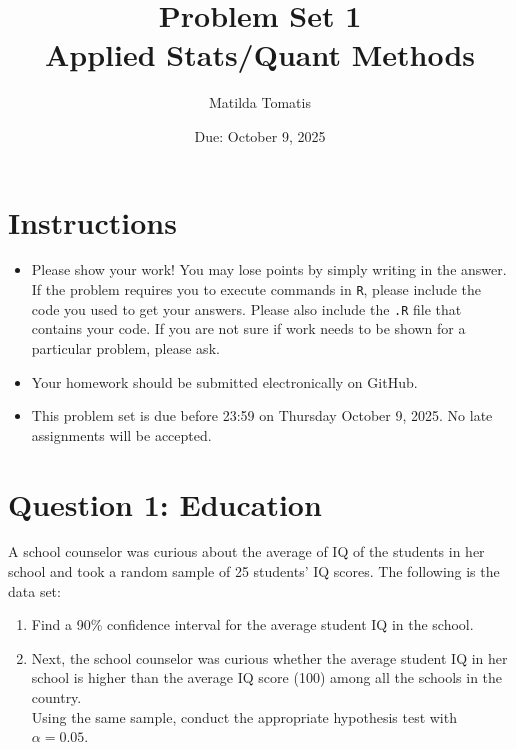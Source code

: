 \documentclass[12pt,letterpaper]{article}
\title{Problem Set 1 \\
\large Applied Stats/Quant Methods }
\date{Due: October 9, 2025}
\author{Matilda Tomatis}
\begin{document}
	\maketitle
	
	\section*{Instructions}
	\begin{itemize}
	\item Please show your work! You may lose points by simply writing in the answer. If the problem requires you to execute commands in \texttt{R}, please include the code you used to get your answers. Please also include the \texttt{.R} file that contains your code. If you are not sure if work needs to be shown for a particular problem, please ask.
\item Your homework should be submitted electronically on GitHub.
\item This problem set is due before 23:59 on Thursday October 9, 2025. No late assignments will be accepted.
	\end{itemize}
	
	\vspace{1cm}
	\section*{Question 1: Education}

A school counselor was curious about the average of IQ of the students in her school and took a random sample of 25 students' IQ scores. The following is the data set:\\
\vspace{.5cm}

  

\vspace{1cm}

\begin{enumerate}
	\item Find a 90\% confidence interval for the average student IQ in the school.\\
	
	\item Next, the school counselor was curious  whether  the average student IQ in her school is higher than the average IQ score (100) among all the schools in the country.\\ 
	
	\noindent Using the same sample, conduct the appropriate hypothesis test with $\alpha=0.05$.
\end{enumerate}
\end{document}
